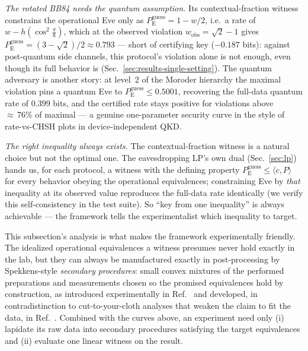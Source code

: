 \documentclass[aps,pra,twocolumn,superscriptaddress,longbibliography,nofootinbib]{revtex4-2}
\newcommand{\Eve}{\mathrm{E}}
\newcommand{\pguess}{P_{\Eve}^{\mathrm{guess}}}
\begin{document}
\emph{The rotated BB84 needs the quantum assumption.} Its
contextual-fraction witness constrains the operational Eve only as
$\pguess = 1-w/2$, i.e.\ a rate of $w - h(\cos^{2}\tfrac{\pi}{8})$,
which at the observed violation $w_{\mathrm{obs}}=\sqrt2-1$ gives
$\pguess=(3-\sqrt2)/2\approx0.793$ --- short of certifying key
($-0.187$ bits): against post-quantum side channels, this protocol's
violation alone is not enough, even though its full behavior is
(Sec.~\ref{sec:results-single-setting}). The quantum adversary is
another story: at level~2 of the Moroder hierarchy the maximal
violation pins a quantum Eve to $\pguess\le 0.5001$, recovering the
full-data quantum rate of $0.399$ bits, and the certified rate stays
positive for violations above ${\approx}\,76\%$ of maximal --- a
genuine one-parameter security curve in the style of rate-vs-CHSH
plots in device-independent QKD.

\emph{The right inequality always exists.} The contextual-fraction
witness is a natural choice but not the optimal one. The eavesdropping
LP's own dual (Sec.~\ref{sec:lp}) hands us, for each protocol, a
witness with the defining property $\pguess\le\langle c,P\rangle$ for
every behavior obeying the operational equivalences; constraining Eve
by \emph{that} inequality at its observed value reproduces the
full-data rate identically (we verify this self-consistency in the test
suite). So ``key from one inequality'' is always achievable --- the
framework tells the experimentalist which inequality to target.

This subsection's analysis is what makes the framework experimentally
friendly. The idealized operational equivalences a witness presumes
never hold exactly in the lab, but they can always be manufactured
exactly in post-processing by Spekkens-style \emph{secondary
procedures}: small convex mixtures of the performed preparations and
measurements chosen so the promised equivalences hold by construction,
as introduced experimentally in Ref.~\cite{Mazurek2016} and developed,
in contradistinction to cut-to-your-cloth analyses that weaken the
claim to fit the data, in Ref.~\cite{Zhang2025secondary}. Combined
with the curves above, an experiment need only (i) lapidate its raw
data into secondary procedures satisfying the target equivalences and
(ii) evaluate one linear witness on the result.
\end{document}
